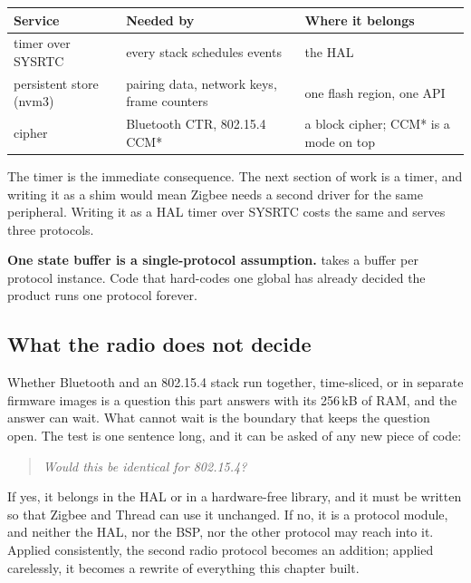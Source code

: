 \begin{center}
\begin{tabular}{@{}lll@{}}
\toprule
Service & Needed by & Where it belongs \\
\midrule
timer over SYSRTC & every stack schedules events & the HAL \\
persistent store (nvm3) & pairing data, network keys, frame counters & one flash region, one API \\
cipher & Bluetooth CTR, 802.15.4 CCM* & a block cipher; CCM* is a mode on top \\
\bottomrule
\end{tabular}
\end{center}

The timer is the immediate consequence. The next section of work is a timer, and writing it as a
 shim would mean Zigbee needs a second driver for the same peripheral. Writing it
as a HAL timer over SYSRTC costs the same and serves three protocols.

\textbf{One state buffer is a single-protocol assumption.}  takes a buffer
per protocol instance. Code that hard-codes one global has already decided the product runs one protocol
forever.

\subsection{What the radio does not decide}

Whether Bluetooth and an 802.15.4 stack run together, time-sliced, or in separate firmware images is a
question this part answers with its 256\,kB of RAM, and the answer can wait. What cannot wait is the
boundary that keeps the question open. The test is one sentence long, and it can be asked of any new piece
of code:

\begin{quote}
\emph{Would this be identical for 802.15.4?}
\end{quote}

If yes, it belongs in the HAL or in a hardware-free library, and it must be written so that Zigbee and
Thread can use it unchanged. If no, it is a protocol module, and neither the HAL, nor the BSP, nor the other
protocol may reach into it. Applied consistently, the second radio protocol becomes an addition; applied
carelessly, it becomes a rewrite of everything this chapter built.
